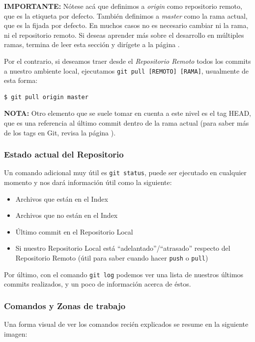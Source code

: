 \documentclass{article}
\begin{document}
\noindent \textbf{IMPORTANTE:} Nótese acá que definimos a \textit{origin} como repositorio remoto, que es la etiqueta por defecto. También definimos a \textit{master} como la rama actual, que es la fijada por defecto. En muchos casos no es necesario cambiar ni la rama, ni el repositorio remoto. Si deseas aprender más sobre el desarrollo en múltiples ramas, termina de leer esta sección y dirígete a la página \pageref{branch}.

Por el contrario, si deseamos traer desde el \textit{Repositorio Remoto} todos los commits a nuestro ambiente local, ejecutamos \texttt{git pull [REMOTO] [RAMA]}, usualmente de esta forma:
\begin{verbatim}
$ git pull origin master
\end{verbatim}

\noindent \textbf{NOTA:} Otro elemento que se suele tomar en cuenta a este nivel es el tag HEAD, que es una referencia al último commit dentro de la rama actual (para saber más de los tags en Git, revisa la página \pageref{tag}).

\subsubsection{Estado actual del Repositorio}

Un comando adicional muy útil es \texttt{git status}, puede ser ejecutado en cualquier momento y nos dará información útil como la siguiente:
\begin{itemize}
\item Archivos que están en el Index
\item Archivos que no están en el Index
\item Último commit en el Repositorio Local
\item Si nuestro Repositorio Local está ``adelantado''/``atrasado'' respecto del Repositorio Remoto (útil para saber cuando hacer \texttt{push} o \texttt{pull})
\end{itemize}

Por último, con el comando \texttt{git log} podemos ver una lista de nuestros últimos commits realizados, y un poco de información acerca de éstos.

\subsubsection{Comandos y Zonas de trabajo}

Una forma visual de ver los comandos recién explicados se resume en la siguiente imagen\cite{flow}: 
\end{document}
